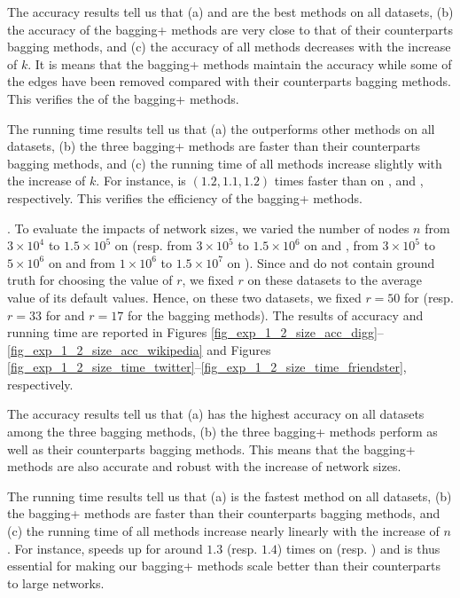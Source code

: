 The accuracy results tell us that
(a) \Biased and \Biasedp are the best methods on all datasets,
(b) the accuracy of the bagging+ methods are very close to that
of their counterparts bagging methods, and (c) the accuracy of all
methods decreases with the increase of $k$. It is means that the
bagging+ methods maintain the accuracy while some of the
edges have been removed compared with their counterparts bagging methods.
This verifies the  of the bagging+ methods.


The running time results tell us that (a) the \Biasedp outperforms
other methods on all datasets, (b) the three bagging+ methods are faster
than their counterparts bagging methods, and (c) the running time of all
methods increase slightly with the increase of $k$. For instance,
\Biasedp is $(1.2, 1.1, 1.2)$ times faster than
\Biased on \Digg, \YouTube and \Wikipedia, respectively.
This verifies the efficiency of the bagging+ methods.







. To evaluate the impacts of network sizes, we varied the
number of nodes $n$ from $3\times 10^4$ to $1.5\times 10^5$ on \Digg (resp.
from $3\times 10^5$ to $1.5\times 10^6$ on \YouTube and \Wikipedia,
from $3\times 10^5$ to $5\times 10^6$ on \Twitter and
from $1\times 10^6$ to $1.5\times 10^7$ on \Friendster).
Since \Twitter and \Friendster do not contain ground truth for choosing the value of $r$,
we fixed $r$ on these datasets to the average value of
its default values. Hence, on these two datasets, we fixed $r = 50$ for \NMF
(resp. $r = 33$ for \BIGCLAM and $r = 17$ for the bagging methods). The results
of accuracy and running time are reported in Figures \ref{fig_exp_1_2_size_acc_digg}--\ref{fig_exp_1_2_size_acc_wikipedia}
and Figures \ref{fig_exp_1_2_size_time_twitter}--\ref{fig_exp_1_2_size_time_friendster}, respectively.



The accuracy results tell us that (a) \Biased has the highest accuracy on all
datasets among the three bagging methods, (b) the three bagging+ methods perform as well as their counterparts
bagging methods. This means that the bagging+ methods are also accurate and
robust with the increase of network sizes.

The running time results tell us that (a) \Biasedp is the fastest method on all
datasets, (b) the bagging+ methods are faster than their counterparts bagging
methods, and (c) the running time of all methods increase nearly linearly with the
increase of $n$. For instance, \Biasedp speeds up \Biased for around
$1.3$ (resp. $1.4$) times on \Twitter (resp. \Friendster) and is thus essential for
making our bagging+ methods scale better than their counterparts to large networks.


